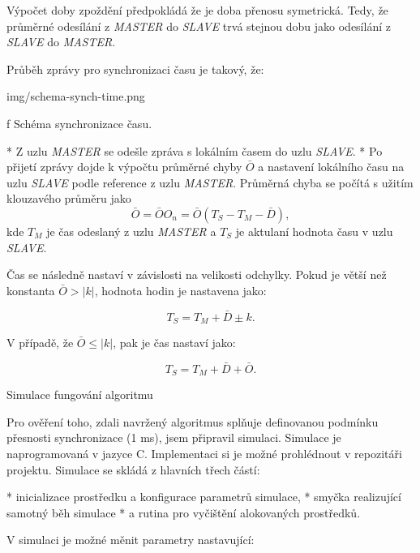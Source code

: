 Výpočet doby zpoždění předpokládá že je doba přenosu symetrická. Tedy, že průměrné odesílání z {\em MASTER} do {\em SLAVE} trvá stejnou dobu jako odesílání z {\em SLAVE} do {\em MASTER}.

Průběh zprávy pro synchronizaci {\sbf času} je takový, že:

\medskip
{}
\picw=16cm \cinspic img/schema-synch-time.png
\caption/f Schéma synchronizace času.
\medskip

\begitems
* {\sbf [A]} Z uzlu {\em MASTER} se odešle zpráva s lokálním časem do uzlu {\em SLAVE}.
* {\sbf [B]} Po přijetí zprávy dojde k výpočtu průměrné chyby $\bar{O}$ a nastavení lokálního času na uzlu {\em SLAVE} podle reference z uzlu {\em MASTER}. Průměrná chyba se počítá s užitím klouzavého průměru jako 
$$
\bar{O} = \bar{O} O_n = \bar{O} (T_S - T_M - \bar{D}),
$$
kde $T_M$ je čas odeslaný z uzlu {\em MASTER} a $T_S$ je aktulaní hodnota času v uzlu {\em SLAVE}.

Čas se následně nastaví v závislosti na velikosti odchylky. Pokud je větší než konstanta $\bar{O} > | k |$, hodnota hodin je nastavena jako:

$$
T_S = T_M + \bar{D} \pm k.
$$

V případě, že $\bar{O} \leq | k |$, pak je čas nastaví jako:

$$
T_S = T_M + \bar{D} + \bar{O}.
$$
\enditems

\secc Simulace fungování algoritmu

Pro ověření toho, zdali navržený algoritmus splňuje definovanou podmínku přesnosti synchronizace (1 ms), jsem připravil simulaci. Simulace je naprogramovaná v jazyce C. Implementaci si je možné prohlédnout v repozitáři projektu. Simulace se skládá z hlavních třech částí:

\begitems
* inicializace prostředku a konfigurace parametrů simulace,
* smyčka realizující samotný běh simulace
* a rutina pro vyčištění alokovaných prostředků.
\enditems

V simulaci je možné {\sbf měnit parametry} nastavující:

